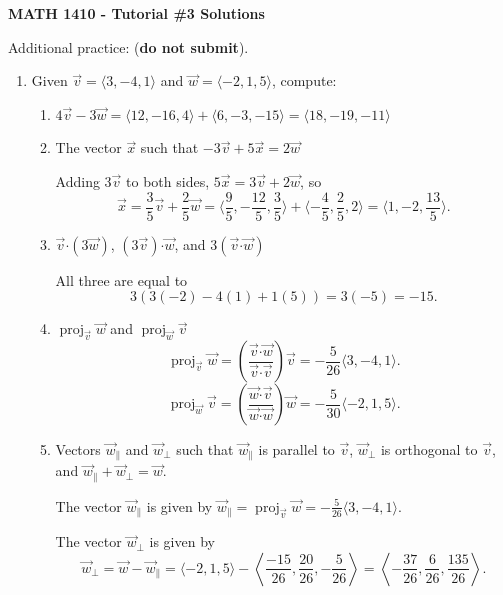 \documentclass[12pt]{article}
\newcommand{\dotp}{\boldsymbol{\cdot}}
\DeclareMathOperator{\proj}{proj}
\begin{document}
\author{Instructor: Sean Fitzpatrick}
\thispagestyle{empty}
\begin{center}
{\bf MATH 1410 - Tutorial \#3 Solutions}
\end{center}


Additional practice: (\textbf{do not submit}).
\begin{enumerate}
\item Given $\vec{v}=\langle 3,-4,1\rangle$ and $\vec{w} = \langle -2,1,5\rangle$, compute:
\begin{enumerate}
\item $4\vec{v}-3\vec{w} = \langle 12, -16, 4\rangle+\langle 6, -3, -15\rangle = \langle 18, -19, -11\rangle$
\item The vector $\vec{x}$ such that $-3\vec{v}+5\vec{x}=2\vec{w}$

Adding $3\vec{v}$ to both sides, $5\vec{x}=3\vec{v}+2\vec{w}$, so
\[
\vec{x}=\frac35\vec{v}+\frac25\vec{w}=\langle \frac95, -\frac{12}{5}, \frac35\rangle+\langle -\frac45,\frac25, 2\rangle = \langle 1, -2, \frac{13}{5}\rangle.
\]
\item $\vec{v}\dotp (3\vec{w})$, $(3\vec{v})\dotp \vec{w}$, and $3(\vec{v}\dotp \vec{w})$

All three are equal to
\[
3(3(-2)-4(1)+1(5))=3(-5)=-15.
\]
\item $\proj_{\vec{v}}\vec{w}$ and $\proj_{\vec{w}}\vec{v}$
\[
\proj_{\vec{v}}\vec{w} = \left(\frac{\vec{v}\dotp\vec{w}}{\vec{v}\dotp\vec{v}}\right)\vec{v}=-\frac{5}{26}\langle 3,-4,1\rangle.
\]
\[
\proj_{\vec{w}}\vec{v} = \left(\frac{\vec{w}\dotp\vec{v}}{\vec{w}\dotp\vec{w}}\right)\vec{w} = -\frac{5}{30}\langle -2,1,5\rangle.
\]
\item Vectors $\vec{w}_{\parallel}$ and $\vec{w}_{\bot}$ such that $\vec{w}_{\parallel}$ is parallel to $\vec{v}$, $\vec{w}_{\bot}$ is orthogonal to $\vec{v}$, and $\vec{w}_{\parallel}+\vec{w}_{\bot}=\vec{w}$.

The vector $\vec{w}_\parallel$ is given by $\vec{w}_\parallel = \proj_{\vec{v}}\vec{w} = -\frac{5}{26}\langle 3,-4,1\rangle$.

The vector $\vec{w}_\bot$ is given by
\[
\vec{w}_\bot = \vec{w}-\vec{w}_\parallel = \langle -2,1,5\rangle -\left\langle \frac{-15}{26},\frac{20}{26},-\frac{5}{26}\right\rangle = \left\langle -\frac{37}{26}, \frac{6}{26}, \frac{135}{26}\right\rangle.
\]
\end{enumerate}
\end{enumerate}
\end{document}
